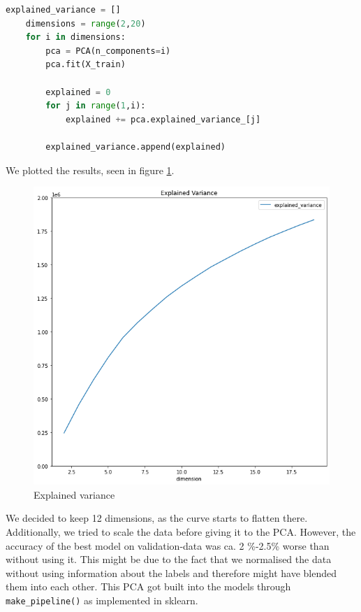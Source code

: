 \documentclass[12pt,a4paper]{scrartcl}		%
\begin{document}
\begin{lstlisting}[language=Python]
    explained_variance = []
    dimensions = range(2,20)
    for i in dimensions:
        pca = PCA(n_components=i)
        pca.fit(X_train)

        explained = 0
        for j in range(1,i):
            explained += pca.explained_variance_[j]
            
        explained_variance.append(explained)
\end{lstlisting}

        We plotted the results, seen in figure \ref{fig::expl_var}.

        \begin{figure}[h]
            \centering
            \includegraphics[scale = 0.45]{expl_var.png}
            \caption{Explained variance}
            \label{fig::expl_var}
        \end{figure} 

        We decided to keep 12 dimensions, as the curve starts to flatten there. 
        Additionally, we tried to scale the data before giving it to the PCA. However, the accuracy of the best model on validation-data was 
        ca. 2 \%-2.5\% worse than without using it. This might be due to the fact that we normalised the data without using information about 
        the labels and therefore might have blended them into each other.
        This PCA got built into the models through \texttt{make\_pipeline()} as implemented in sklearn. 
\end{document}
